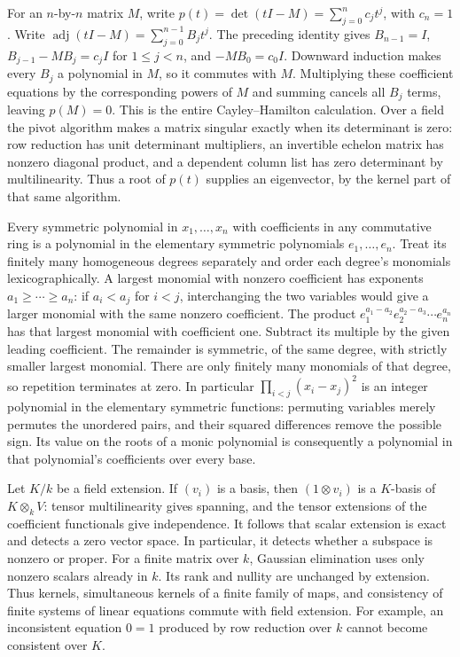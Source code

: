 \documentclass[11pt,a4paper,openany]{report}
\begin{document}
For an \(n\)-by-\(n\) matrix \(M\), write \(p(t)=\det(tI-M)=\sum_{j=0}^n c_jt^j\), with \(c_n=1\). Write \(\operatorname{adj}(tI-M)=\sum_{j=0}^{n-1}B_jt^j\). The preceding identity gives \(B_{n-1}=I\), \(B_{j-1}-MB_j=c_jI\) for \(1\le j<n\), and \(-MB_0=c_0I\). Downward induction makes every \(B_j\) a polynomial in \(M\), so it commutes with \(M\). Multiplying these coefficient equations by the corresponding powers of \(M\) and summing cancels all \(B_j\) terms, leaving \(p(M)=0\). This is the entire Cayley--Hamilton calculation. Over a field the pivot algorithm makes a matrix singular exactly when its determinant is zero: row reduction has unit determinant multipliers, an invertible echelon matrix has nonzero diagonal product, and a dependent column list has zero determinant by multilinearity. Thus a root of \(p(t)\) supplies an eigenvector, by the kernel part of that same algorithm.

Every symmetric polynomial in \(x_1,\ldots,x_n\) with coefficients in any commutative ring is a polynomial in the elementary symmetric polynomials \(e_1,\ldots,e_n\). Treat its finitely many homogeneous degrees separately and order each degree's monomials lexicographically. A largest monomial with nonzero coefficient has exponents \(a_1\ge\cdots\ge a_n\): if \(a_i<a_j\) for \(i<j\), interchanging the two variables would give a larger monomial with the same nonzero coefficient. The product \(e_1^{a_1-a_2}e_2^{a_2-a_3}\cdots e_n^{a_n}\) has that largest monomial with coefficient one. Subtract its multiple by the given leading coefficient. The remainder is symmetric, of the same degree, with strictly smaller largest monomial. There are only finitely many monomials of that degree, so repetition terminates at zero. In particular \(\prod_{i<j}(x_i-x_j)^2\) is an integer polynomial in the elementary symmetric functions: permuting variables merely permutes the unordered pairs, and their squared differences remove the possible sign. Its value on the roots of a monic polynomial is consequently a polynomial in that polynomial's coefficients over every base.

Let \(K/k\) be a field extension. If \((v_i)\) is a basis, then \((1\otimes v_i)\) is a \(K\)-basis of \(K\otimes_k V\): tensor multilinearity gives spanning, and the tensor extensions of the coefficient functionals give independence. It follows that scalar extension is exact and detects a zero vector space. In particular, it detects whether a subspace is nonzero or proper. For a finite matrix over \(k\), Gaussian elimination uses only nonzero scalars already in \(k\). Its rank and nullity are unchanged by extension. Thus kernels, simultaneous kernels of a finite family of maps, and consistency of finite systems of linear equations commute with field extension. For example, an inconsistent equation \(0=1\) produced by row reduction over \(k\) cannot become consistent over \(K\).
\end{document}

